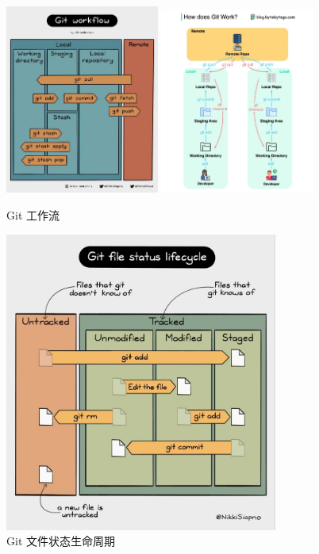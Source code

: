 \documentclass{ctexart}
\begin{document}
\begin{figure}[htbp]
    \centering
    \includegraphics[width=0.45\textwidth]{pictures/03.jpg}
    \qquad
    \includegraphics[width=0.45\textwidth]{pictures/05.jpg}
    \caption{Git 工作流}
\end{figure}

\begin{figure}[htbp]
    \centering
    \includegraphics[width=0.80\textwidth]{pictures/04.jpg}
    \caption{Git 文件状态生命周期}
\end{figure}
\end{document}
